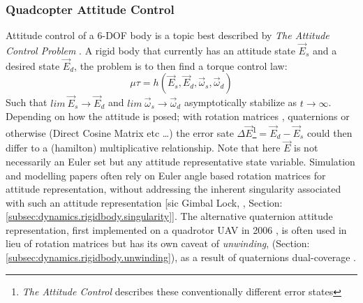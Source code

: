 \subsubsection*{Quadcopter Attitude Control}
Attitude control of a 6-DOF body is a topic best described by \emph{The Attitude Control Problem} \cite{attitudecontrolproblem}. A rigid body that currently has an attitude state $\vec{E}_s$ and a desired state $\vec{E}_d$, the problem is to then find a torque control law:
\begin{equation} \label{eq:2}
\mu\tau = h(\vec{E}_s,\vec{E}_d,\vec{\omega}_s,\vec{\omega}_d)
\end{equation}
Such that $lim~\vec{E}_s \rightarrow \vec{E}_d$ and $lim~\vec{\omega}_s \rightarrow \vec{\omega}_d$ asymptotically stabilize as $t \rightarrow \infty$. Depending on how the attitude is posed; with rotation matrices \cite{rigidbodylecture,eulerrigidbody,rotationsequences}, quaternions \cite{quaterniondynamics, rotationsequences, spacecraftattitutdequaternions,fullquaternion} or otherwise (Direct Cosine Matrix etc \ldots) the error sate $\Delta\vec{E}$\footnote{\emph{The Attitude Control} \cite{attitudecontrolproblem} describes these conventionally different error states}$= \vec{E}_d - \vec{E}_s$ could then differ to a (hamilton) multiplicative relationship. Note that here $\vec{E}$ is not necessarily an Euler set but any attitude representative state variable. Simulation and modelling papers often rely on Euler angle based rotation matrices for attitude representation, \cite{adaptivedisturbancecontrol, optimizedpidquadcopter, singleaxistilting, backsteppingquadcoptercontrol, fullquadcoptercontrol} without addressing the inherent singularity associated with such an attitude representation [sic Gimbal Lock, \cite{euleranglesingularity}, Section:\ref{subsec:dynamics.rigidbody.singularity}]. The alternative quaternion attitude representation, first implemented on a quadrotor UAV in 2006 \cite{attitudestabilization}, is often used in lieu of rotation matrices but has its own caveat of \emph{unwinding}, (Section:\ref{subsec:dynamics.rigidbody.unwinding}), as a result of quaternions dual-coverage \cite{unwinding}.
\par
